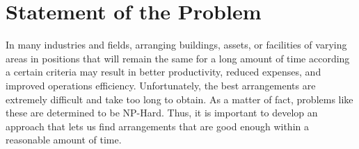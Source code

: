 \chapter{Statement of the Problem} 
\label{sec:ResearchQ}



In many industries and fields, arranging buildings, assets, or facilities of varying areas in positions that will remain the same for a long amount of time according a certain criteria may result in better productivity, reduced expenses, and improved operations efficiency. Unfortunately, the best arrangements are extremely difficult and take too long to obtain. As a matter of fact, problems like these are determined to be NP-Hard. Thus, it is important to develop an approach that lets us find arrangements that are good enough within a reasonable amount of time.

